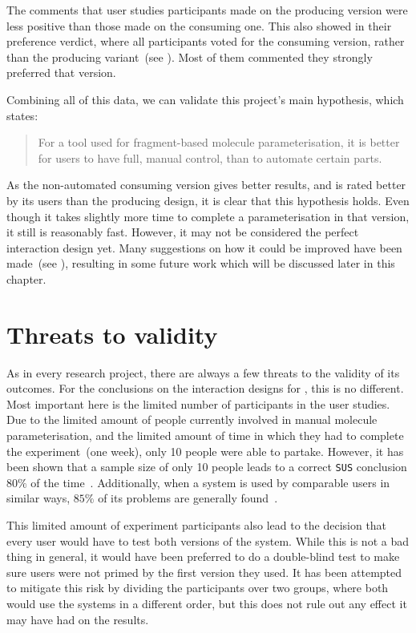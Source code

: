 The comments that user studies participants made on the producing version were less positive than those made on the consuming one. This also showed in their preference verdict, where all participants voted for the consuming version, rather than the producing variant~(see ). Most of them commented they strongly preferred that version.

Combining all of this data, we can validate this project's main hypothesis, which states:
\begin{quote}
For a tool used for fragment-based molecule parameterisation, it is better for users to have full, manual control, than to automate certain parts.
\end{quote}
As the non-automated consuming version gives better results, and is rated better by its users than the producing design, it is clear that this hypothesis holds. Even though it takes slightly more time to complete a parameterisation in that version, it still is reasonably fast. However, it may not be considered the perfect interaction design yet. Many suggestions on how it could be improved have been made~(see ), resulting in some future work which will be discussed later in this chapter.



\section{Threats to validity}
As in every research project, there are always a few threats to the validity of its outcomes. For the conclusions on the interaction designs for \oframp, this is no different. Most important here is the limited number of participants in the user studies. Due to the limited amount of people currently involved in manual molecule parameterisation, and the limited amount of time in which they had to complete the experiment~(one week), only 10 people were able to partake. However, it has been shown that a sample size of only 10 people leads to a correct \verb|SUS| conclusion $80\%$ of the time~\cite{tullis2004comparison}. Additionally, when a system is used by comparable users in similar ways, $85\%$ of its problems are generally found~\cite{nielsen2000you}.

This limited amount of experiment participants also lead to the decision that every user would have to test both versions of the system. While this is not a bad thing in general, it would have been preferred to do a double-blind test to make sure users were not primed by the first version they used. It has been attempted to mitigate this risk by dividing the participants over two groups, where both would use the systems in a different order, but this does not rule out any effect it may have had on the results.

